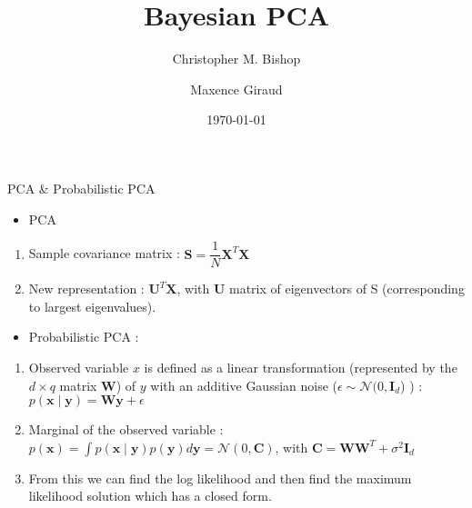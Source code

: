 \documentclass[fleqn]{beamer}
\title{Bayesian PCA }
\subtitle{\normalsize{Christopher M. Bishop}}
\author{Maxence Giraud}
\institute{Master Data Science - Bayesian Learning}
\date{\today}
\begin{document}
\begin{frame}
    \titlepage
\end{frame}

\begin{frame}{PCA \& Probabilistic PCA}
    \begin{itemize}
        \item PCA
    \end{itemize}
    \begin{enumerate}
        \item Sample covariance matrix : $ \mathbf{S} = \dfrac{1}{N} \mathbf{X}^T \mathbf{X} $ 
        \item New representation : $ \mathbf{U}^T \mathbf{X}$, with $\mathbf{U}$ matrix of eigenvectors of S (corresponding to largest eigenvalues).
        
    \end{enumerate}
    \pause
    \begin{itemize}[<+->]
        \item Probabilistic PCA \cite{tipping1999ppca} : 
    \end{itemize}
    \begin{enumerate}
        \item Observed variable $x$ is defined as a linear transformation (represented by the $d \times q$ matrix $\mathbf{W}$) of $y$ with an additive Gaussian noise ($\epsilon \sim \mathcal{N}(0,\mathbf{I}_d$) )  : $p(\mathbf{x} \mid \mathbf{y}) = \mathbf{W} \mathbf{y} + \epsilon$
        \item Marginal of the observed variable : $p(\mathbf{x})=\int p(\mathbf{x} \mid \mathbf{y}) p(\mathbf{y}) d \mathbf{y}=\mathcal{N}(0, \mathbf{C})$, with $\mathbf{C} = \mathbf{W} \mathbf{W}^T + \sigma^2 \mathbf{I}_d $
        \item From this we can find the log likelihood and then find the maximum likelihood solution which has a closed form.
    \end{enumerate}
    
    
\end{frame}
\end{document}
